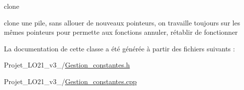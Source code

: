 clone 

clone une pile, sans allouer de nouveaux pointeurs, on travaille toujours sur les mêmes pointeurs pour permette aux fonctions annuler, rétablir de fonctionner 

La documentation de cette classe a été générée à partir des fichiers suivants \-:\begin{DoxyCompactItemize}
\item 
Projet\-\_\-\-L\-O21\-\_\-v3\-\_/\hyperlink{_gestion__constantes_8h}{Gestion\-\_\-constantes.\-h}\item 
Projet\-\_\-\-L\-O21\-\_\-v3\-\_/\hyperlink{_gestion__constantes_8cpp}{Gestion\-\_\-constantes.\-cpp}\end{DoxyCompactItemize}
